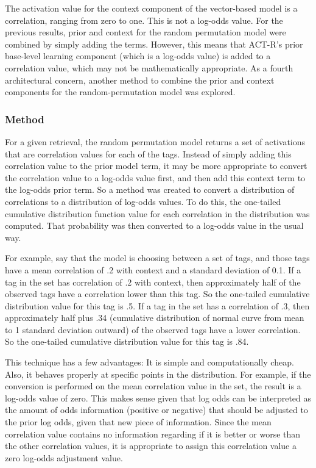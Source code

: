 \documentclass[man,floatsintext,donotrepeattitle]{apa6}
\begin{document}
The activation value for the context component of the vector-based model is a correlation, ranging from zero to one.
This is not a log-odds value.
For the previous results, prior and context for the random permutation model were combined by simply adding the terms.
However, this means that ACT-R's prior base-level learning component (which is a log-odds value) is added to a correlation value, which may not be mathematically appropriate.
As a fourth architectural concern, another method to combine the prior and context components for the random-permutation model was explored.

\subsubsection{Method}

For a given retrieval, the random permutation model returns a set of activations that are correlation values for each of the tags.
Instead of simply adding this correlation value to the prior model term, it may be more appropriate to convert the correlation value to a log-odds value first, and then add this context term to the log-odds prior term.
So a method was created to convert a distribution of correlations to a distribution of log-odds values.
To do this, the one-tailed cumulative distribution function value for each correlation in the distribution was computed.
That probability was then converted to a log-odds value in the usual way. 

For example, say that the model is choosing between a set of tags, and those tags have a mean correlation of .2 with context and a standard deviation of 0.1.
If a tag in the set has correlation of .2 with context, then approximately half of the observed tags have a correlation lower than this tag.
So the one-tailed cumulative distribution value for this tag is .5.
If a tag in the set has a correlation of .3, then approximately half plus .34 (cumulative distribution of normal curve from mean to 1 standard deviation outward) of the observed tags have a lower correlation.
So the one-tailed cumulative distribution value for this tag is .84.

This technique has a few advantages: 
It is simple and computationally cheap.
Also, it behaves properly at specific points in the distribution.
For example, if the conversion is performed on the mean correlation value in the set, the result is a log-odds value of zero.
This makes sense given that log odds can be interpreted as the amount of odds information (positive or negative) that should be adjusted to the prior log odds, given that new piece of information.
Since the mean correlation value contains no information regarding if it is better or worse than the other correlation values, it is appropriate to assign this correlation value a zero log-odds adjustment value.
\end{document}
